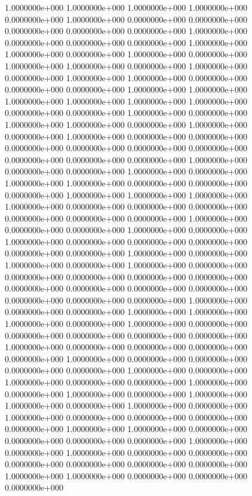   1.0000000e+000  1.0000000e+000  1.0000000e+000  1.0000000e+000  0.0000000e+000
  1.0000000e+000  0.0000000e+000  0.0000000e+000  0.0000000e+000  0.0000000e+000
  0.0000000e+000  1.0000000e+000  0.0000000e+000  0.0000000e+000  0.0000000e+000
  1.0000000e+000  1.0000000e+000  0.0000000e+000  1.0000000e+000  0.0000000e+000
  1.0000000e+000  1.0000000e+000  0.0000000e+000  1.0000000e+000  0.0000000e+000
  1.0000000e+000  1.0000000e+000  0.0000000e+000  0.0000000e+000  0.0000000e+000
  1.0000000e+000  1.0000000e+000  1.0000000e+000  1.0000000e+000  1.0000000e+000
  1.0000000e+000  0.0000000e+000  0.0000000e+000  1.0000000e+000  0.0000000e+000
  1.0000000e+000  1.0000000e+000  0.0000000e+000  1.0000000e+000  0.0000000e+000
  1.0000000e+000  0.0000000e+000  0.0000000e+000  0.0000000e+000  0.0000000e+000
  0.0000000e+000  0.0000000e+000  0.0000000e+000  0.0000000e+000  0.0000000e+000
  1.0000000e+000  0.0000000e+000  0.0000000e+000  1.0000000e+000  0.0000000e+000
  1.0000000e+000  1.0000000e+000  0.0000000e+000  0.0000000e+000  0.0000000e+000
  1.0000000e+000  1.0000000e+000  1.0000000e+000  1.0000000e+000  0.0000000e+000
  0.0000000e+000  0.0000000e+000  0.0000000e+000  0.0000000e+000  0.0000000e+000
  1.0000000e+000  0.0000000e+000  0.0000000e+000  1.0000000e+000  0.0000000e+000
  1.0000000e+000  0.0000000e+000  0.0000000e+000  0.0000000e+000  0.0000000e+000
  0.0000000e+000  1.0000000e+000  0.0000000e+000  1.0000000e+000  0.0000000e+000
  1.0000000e+000  0.0000000e+000  0.0000000e+000  0.0000000e+000  0.0000000e+000
  0.0000000e+000  0.0000000e+000  0.0000000e+000  0.0000000e+000  0.0000000e+000
  0.0000000e+000  0.0000000e+000  0.0000000e+000  1.0000000e+000  0.0000000e+000
  0.0000000e+000  1.0000000e+000  1.0000000e+000  1.0000000e+000  0.0000000e+000
  1.0000000e+000  0.0000000e+000  0.0000000e+000  0.0000000e+000  0.0000000e+000
  0.0000000e+000  1.0000000e+000  0.0000000e+000  0.0000000e+000  0.0000000e+000
  0.0000000e+000  1.0000000e+000  0.0000000e+000  0.0000000e+000  0.0000000e+000
  0.0000000e+000  1.0000000e+000  0.0000000e+000  1.0000000e+000  0.0000000e+000
  0.0000000e+000  1.0000000e+000  0.0000000e+000  1.0000000e+000  0.0000000e+000
  1.0000000e+000  1.0000000e+000  0.0000000e+000  1.0000000e+000  0.0000000e+000
  1.0000000e+000  0.0000000e+000  0.0000000e+000  0.0000000e+000  0.0000000e+000
  1.0000000e+000  1.0000000e+000  0.0000000e+000  0.0000000e+000  0.0000000e+000
  0.0000000e+000  1.0000000e+000  0.0000000e+000  1.0000000e+000  0.0000000e+000
  0.0000000e+000  0.0000000e+000  0.0000000e+000  0.0000000e+000  0.0000000e+000
  1.0000000e+000  1.0000000e+000  0.0000000e+000  0.0000000e+000  0.0000000e+000
